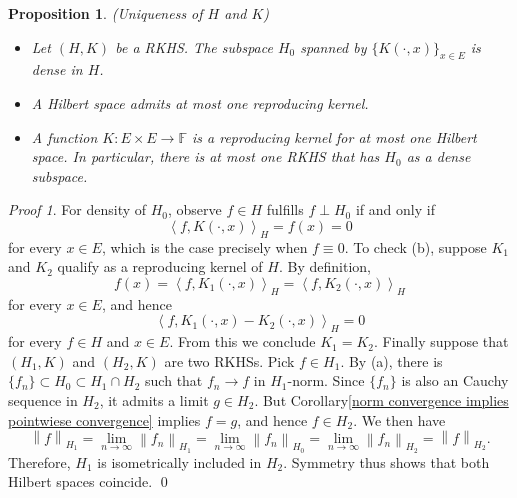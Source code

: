 \documentclass[a4paper,12pt]{article}
\newtheorem{prp}[thm]{Proposition}
\theoremstyle{remark}
\newtheorem*{prf}{Proof}
\theoremstyle{definition}
\theoremstyle{definition}
\theoremstyle{definition}
\newcommand{\ip}[2]{\left<#1, #2 \right>}
\newcommand{\norm}[1]{\left\| #1 \right\|}
\begin{document}
\begin{prp}(Uniqueness of \( H \) and \( K \))\label{Density and Unique of RKHS}

	\begin{itemize}
		\item[(a)] Let \( (H,K) \) be a RKHS. The subspace \( H_0 \) spanned by \( \{K(\cdot ,x) \} _{x \in E} \) is dense in \( H \).
		\item[(b)] A Hilbert space admits at most one reproducing kernel.
		\item[(c)] A function \( K:E \times E \to \mathbb{F} \) is a reproducing kernel for at most one Hilbert space. In particular, there is at most one RKHS that has \( H_0 \) as a dense subspace.
	\end{itemize}
\end{prp}
\begin{prf}
	For density of \( H_0 \), observe \( f \in H \) fulfills \( f \perp H_0 \) if and only if
	\begin{equation*}
		\ip{f}{K(\cdot ,x)}_H = f(x)=0
	\end{equation*}
	for every \( x \in E \), which is the case precisely when \( f \equiv 0 \).
	To check (b), suppose \( K_1 \) and \( K_2 \) qualify as a reproducing kernel of \( H \). By definition,
	\begin{equation*}
		f(x) = \ip{f}{K_1(\cdot ,x)}_H =\ip{f}{K_2(\cdot ,x)}_H
	\end{equation*}
	for every \( x \in E \), and hence
	\begin{equation*}
		\ip{f}{K_1(\cdot ,x)- K_2(\cdot ,x)}_H = 0
	\end{equation*}
	for every \( f \in H \) and \( x \in E \). From this we conclude \( K_1 =K_2 \).
	Finally suppose that \( (H_1,K) \) and \( (H_2,K) \) are two RKHSs.
	Pick \( f \in H_1 \). By (a), there is \( \{f_n\} \subset H_0 \subset H_1 \cap H_2 \) such that \( f_n \to f \) in \( H_1 \)-norm. Since \( \{f_n\} \) is also an Cauchy sequence in \( H_2 \), it admits a limit \( g \in H_2 \). But Corollary\ref{norm convergence implies pointwiese convergence} implies \( f=g \), and hence \( f \in H_2 \). We then have
	\begin{equation*}
		\norm{f}_{H_1}
		= \lim_{n \to \infty} \norm{f_n}_{H_1}
		=\lim_{n \to \infty} \norm{f_n}_{H_0}
		=\lim_{n \to \infty} \norm{f_n}_{H_2}
		=\norm{f}_{H_2}.
	\end{equation*}
	Therefore, \( H_1 \) is isometrically included in \( H_2 \). Symmetry thus shows that both Hilbert spaces coincide.
	\qed\end{prf}
\end{document}
